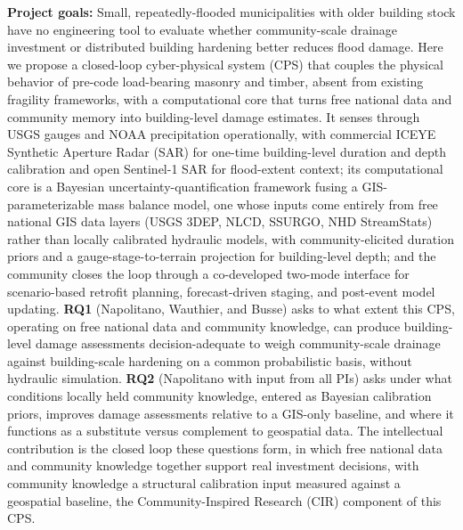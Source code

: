 \documentclass[11pt]{article}
\begin{document}
\setlength{\baselineskip}{12.6pt}
\setlength{\normalbaselineskip}{12.6pt}


\begin{tcolorbox}[colback=mycmykcolor, colframe=black, boxrule=1pt, coltext=black]
\textbf{Project goals:}
Small, repeatedly-flooded municipalities with older building stock have no
engineering tool to evaluate whether community-scale drainage investment or distributed
building hardening better reduces flood damage.
Here we propose a closed-loop cyber-physical system (CPS) that couples the physical
behavior of pre-code load-bearing masonry and timber, absent from existing fragility
frameworks, with a computational core that turns free national data and community
memory into building-level damage estimates. It senses through USGS gauges and NOAA
precipitation operationally, with commercial ICEYE Synthetic Aperture Radar (SAR) for
one-time building-level duration and depth calibration and open Sentinel-1 SAR for
flood-extent context; its computational core is a Bayesian uncertainty-quantification
framework fusing a GIS-parameterizable mass balance model, one whose inputs come
entirely from free national GIS data layers (USGS 3DEP, NLCD, SSURGO, NHD
StreamStats) rather than locally calibrated hydraulic models, with community-elicited
duration priors and a gauge-stage-to-terrain projection for building-level depth; and
the community closes the loop through a co-developed two-mode interface for scenario-based retrofit planning, forecast-driven staging, and post-event model updating.
\textbf{RQ1} (Napolitano, Wauthier, and Busse) asks to what extent this CPS,
operating on free national data and community knowledge, can produce building-level
damage assessments decision-adequate to weigh community-scale drainage against
building-scale hardening on a common probabilistic basis, without hydraulic
simulation.
\textbf{RQ2} (Napolitano with input from all PIs) asks under what conditions locally held
community knowledge, entered as Bayesian calibration priors, improves damage
assessments relative to a GIS-only baseline, and where it functions as a substitute
versus complement to geospatial data.
The intellectual contribution is the closed loop these questions form, in which free
national data and community knowledge together support real investment decisions, with
community knowledge a structural calibration input measured against a geospatial
baseline, the Community-Inspired Research (CIR) component of this CPS.
\end{tcolorbox}
\vspace{-0.5cm}
\normalsize
\end{document}
